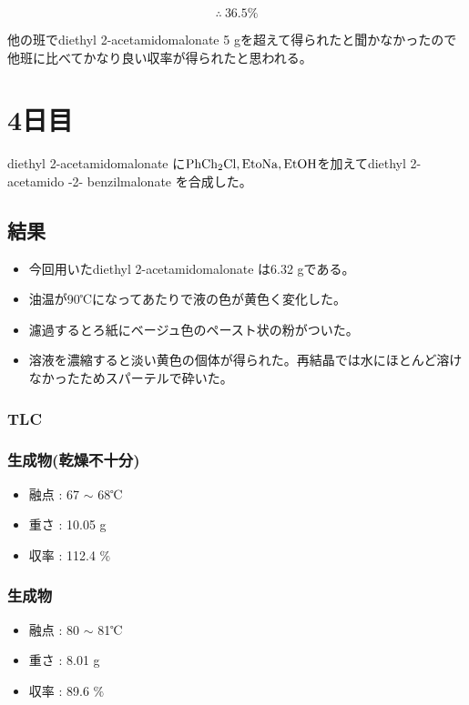 \[\therefore
\ 36.5 \%\]

他の班でdiethyl 2-acetamidomalonate 5 gを超えて得られたと聞かなかったので他班に比べてかなり良い収率が得られたと思われる。

\section*{4日目}
diethyl 2-acetamidomalonate に$\rm PhCh_2Cl, EtoNa, EtOH$を加えてdiethyl 2-acetamido -2- benzilmalonate を合成した。

\subsection*{結果}
\begin{itemize}
\item 今回用いたdiethyl 2-acetamidomalonate は6.32 gである。
\item 油温が90℃になってあたりで液の色が黄色く変化した。
\item 濾過するとろ紙にベージュ色のペースト状の粉がついた。
\item 溶液を濃縮すると淡い黄色の個体が得られた。再結晶では水にほとんど溶けなかったためスパーテルで砕いた。

\end{itemize}
\subsubsection*{TLC}

\subsubsection*{生成物(乾燥不十分)}
\begin{itemize}
\item 融点 : 67 $\sim$ 68℃
\item 重さ : 10.05 g
\item 収率 : 112.4 $\%$
\end{itemize}
\subsubsection*{生成物}
\begin{itemize}
\item 融点 : 80 $\sim$ 81℃
\item 重さ : 8.01 g
\item 収率 : 89.6 $\%$

\end{itemize}
